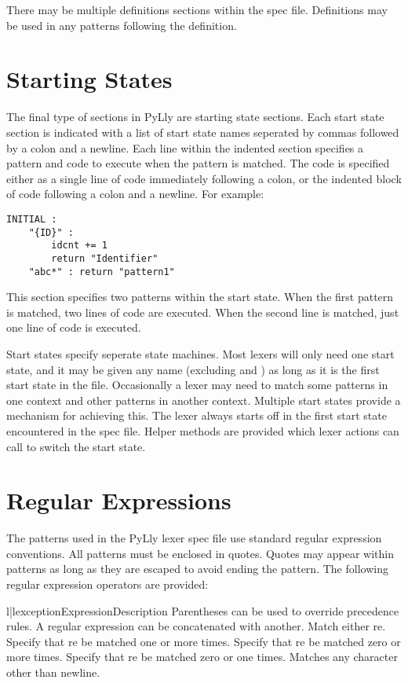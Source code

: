 There may be multiple definitions sections within the spec file.  Definitions
may be used in any patterns following the definition.

\section{Starting States}
The final type of sections in PyLly are starting state sections.  Each
start state section is indicated with a list of start state names seperated
by commas followed by a colon and a newline.  Each line within the
indented section specifies a pattern and code to execute when the pattern
is matched.  The code is specified either as a single line of code
immediately following a colon, or the indented block of code following
a colon and a newline.  For example:

\begin{verbatim}
INITIAL :
    "{ID}" :
        idcnt += 1
        return "Identifier"
    "abc*" : return "pattern1"
\end{verbatim}

This section specifies two patterns within the  start state.
When the first pattern is matched, two lines of code are executed.
When the second line is matched, just one line of code is executed.

Start states specify seperate state machines.  Most lexers will only
need one start state, and it may be given any name (excluding 
 and ) 
as long as it is the first start state in the file.  
Occasionally a lexer may need to match some patterns in one context
and other patterns in another context.  Multiple start states provide
a mechanism for achieving this.  The lexer always starts off in the
first start state encountered in the spec file.  Helper methods
are provided which lexer actions can call to switch the start state.

\section{Regular Expressions}
The patterns used in the PyLly lexer spec file use standard regular
expression conventions.  All patterns must be enclosed in quotes.
Quotes may appear within patterns as long as they are escaped to avoid
ending the pattern.
The following regular expression operators
are provided:

\begin{tableii}{l|l}{exception}{Expression}{Description}
    {Parentheses can be used to override precedence rules.}
     {A regular expression can be concatenated with another.}
   {Match either re.}
      {Specify that re be matched one or more times.}
      {Specify that re be matched zero or more times.}
      {Specify that re be matched zero or one times.}
         {Matches any character other than newline.}
\end{tableii}

